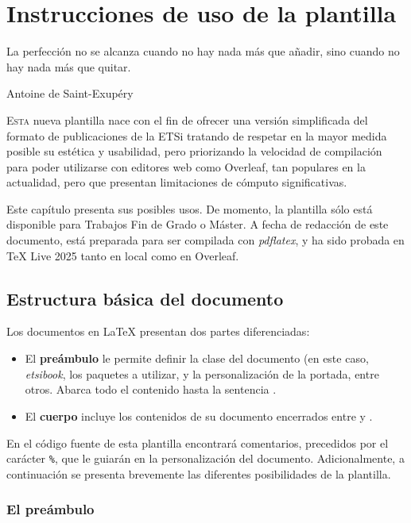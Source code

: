 \chapter{Instrucciones de uso de la plantilla}

\epigraph{La perfección no se alcanza cuando no hay nada más que añadir, sino cuando no hay nada más que quitar.}{Antoine de Saint-Exupéry}

\lettrine[lraise=-0.1, lines=2, loversize=0.2]{E}{sta} nueva plantilla nace con el fin de ofrecer una versión simplificada del formato de publicaciones de la ETSi tratando de respetar en la mayor medida posible su estética y usabilidad, pero priorizando la velocidad de compilación para poder utilizarse con editores web como Overleaf, tan populares en la actualidad, pero que presentan limitaciones de cómputo significativas.

Este capítulo presenta sus posibles usos. De momento, la plantilla sólo está disponible para Trabajos Fin de Grado o Máster. 
A fecha de redacción de este documento, está preparada para ser compilada con \textit{pdflatex}, y ha sido probada en TeX Live 2025 tanto en local como en Overleaf.

\section{Estructura básica del documento}

Los documentos en \LaTeX{} presentan dos partes diferenciadas: 
\begin{itemize}\itemsep 0em
    \item El \textbf{preámbulo} le permite definir la clase del documento (en este caso, \textit{etsibook}, los paquetes a utilizar, y la personalización de la portada, entre otros. Abarca todo el contenido hasta la sentencia \lstinline||.
    \item El \textbf{cuerpo} incluye los contenidos de su documento encerrados entre \lstinline|| y \lstinline||.
\end{itemize}

En el código fuente de esta plantilla encontrará comentarios, precedidos por el carácter \lstinline|%|, que le guiarán en la personalización del documento. Adicionalmente, a continuación se presenta brevemente las diferentes posibilidades de la plantilla.

\subsection{El preámbulo}

